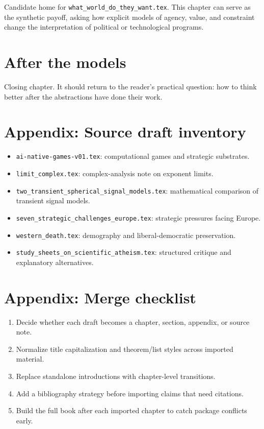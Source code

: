 \documentclass[11pt,twoside,openright]{book}
\begin{document}
Candidate home for \texttt{what\_world\_do\_they\_want.tex}. This chapter can
serve as the synthetic payoff, asking how explicit models of agency, value, and
constraint change the interpretation of political or technological programs.

\chapter{After the models}

Closing chapter. It should return to the reader's practical question: how to
think better after the abstractions have done their work.

\appendix

\chapter{Appendix: Source draft inventory}

\begin{itemize}
  \item \texttt{ai-native-games-v01.tex}: computational games and strategic
        substrates.
  \item \texttt{limit\_complex.tex}: complex-analysis note on exponent limits.
  \item \texttt{two\_transient\_spherical\_signal\_models.tex}: mathematical
        comparison of transient signal models.
  \item \texttt{seven\_strategic\_challenges\_europe.tex}: strategic pressures
        facing Europe.
  \item \texttt{western\_death.tex}: demography and liberal-democratic
        preservation.
  \item \texttt{study\_sheets\_on\_scientific\_atheism.tex}: structured critique
        and explanatory alternatives.
\end{itemize}

\chapter{Appendix: Merge checklist}

\begin{enumerate}
  \item Decide whether each draft becomes a chapter, section, appendix, or source
        note.
  \item Normalize title capitalization and theorem/list styles across imported
        material.
  \item Replace standalone introductions with chapter-level transitions.
  \item Add a bibliography strategy before importing claims that need citations.
  \item Build the full book after each imported chapter to catch package
        conflicts early.
\end{enumerate}
\end{document}
